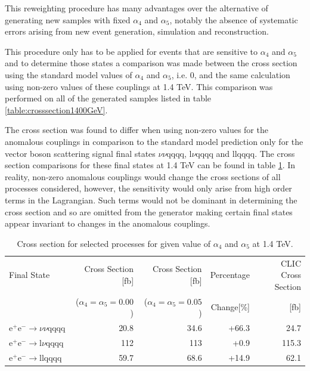 This reweighting procedure has many advantages over the alternative of generating new samples with fixed $\alpha_{4}$ and $\alpha_{5}$, notably the absence of systematic errors arising from new event generation, simulation and reconstruction.  

This procedure only has to be applied for events that are sensitive to $\alpha_{4}$ and $\alpha_{5}$ and to determine those states a comparison was made between the cross section using the standard model values of $\alpha_{4}$ and $\alpha_{5}$, i.e. 0, and the same calculation using non-zero values of these couplings at 1.4 TeV.  This comparison was performed on all of the generated samples listed in table \ref{table:crosssection1400GeV}.  

The cross section was found to differ when using non-zero values for the anomalous couplings in comparison to the standard model prediction only for the vector boson scattering signal final states $\nu\nu\text{qqqq}$, $\text{l}\nu\text{qqqq}$ and llqqqq.  The cross section comparisons for these final states at 1.4 TeV can be found in table \ref{table:crosssectionsensitivity1400}.  In reality, non-zero anomalous couplings would change the cross sections of all processes considered, however, the sensitivity would only arise from high order terms in the Lagrangian.  Such terms would not be dominant in determining the cross section and so are omitted from the generator making certain final states appear invariant to changes in the anomalous couplings.

\begin{table}[h!]
\centering
\begin{tabular}{ l r r r r }
\hline
Final State & Cross Section [fb] & Cross Section [fb] & Percentage & CLIC Cross Section \\ 
& ($\alpha_{4} = \alpha_{5} = 0.00$) & ($\alpha_{4} = \alpha_{5} = 0.05$) & Change[\%] & [fb] \\ 
\hline
$\text{e}^{+}\text{e}^{-} \rightarrow \nu{\nu}\text{qqqq}$ & 20.8 & 34.6 & +66.3 & 24.7 \\
$\text{e}^{+}\text{e}^{-} \rightarrow \text{l}{\nu}\text{qqqq}$ & 112 & 113 & +0.9 & 115.3 \\
$\text{e}^{+}\text{e}^{-} \rightarrow \text{llqqqq}$ & 59.7 & 68.6 & +14.9 & 62.1 \\
\hline
\end{tabular}
\caption{Cross section for selected processes for given value of $\alpha_{4}$ and $\alpha_{5}$ at 1.4 TeV.}
\label{table:crosssectionsensitivity1400}
\end{table}

